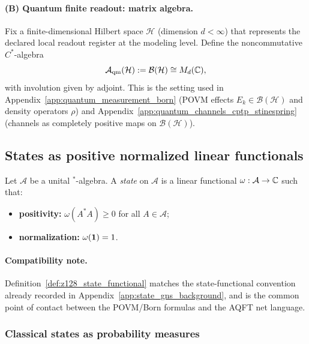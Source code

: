 \paragraph{(B) Quantum finite readout: matrix algebra.}
Fix a finite-dimensional Hilbert space $\mathcal{H}$ (dimension $d<\infty$) that represents the declared local readout register at the modeling level.
Define the noncommutative $C^\ast$-algebra
\[
\mathcal{A}_{\mathrm{qm}}(\mathcal{H}):=\mathcal{B}(\mathcal{H})\cong M_d(\mathbb{C}),
\]
with involution given by adjoint.
This is the setting used in Appendix~\ref{app:quantum_measurement_born} (POVM effects $E_k\in\mathcal{B}(\mathcal{H})$ and density operators $\rho$) and Appendix~\ref{app:quantum_channels_cptp_stinespring} (channels as completely positive maps on $\mathcal{B}(\mathcal{H})$).

\subsection{States as positive normalized linear functionals}

\begin{definition}\label{def:z128_state_functional}
\MathTag Let $\mathcal{A}$ be a unital $^\ast$-algebra.
A \emph{state} on $\mathcal{A}$ is a linear functional $\omega:\mathcal{A}\to\mathbb{C}$ such that:
\begin{itemize}
\item \textbf{positivity:} $\omega(A^\ast A)\ge 0$ for all $A\in\mathcal{A}$;
\item \textbf{normalization:} $\omega(\mathbf{1})=1$.
\end{itemize}
\end{definition}

\paragraph{Compatibility note.}
Definition~\ref{def:z128_state_functional} matches the state-functional convention already recorded in Appendix~\ref{app:state_gns_background}, and is the common point of contact between the POVM/Born formulas and the AQFT net language.

\subsubsection{Classical states as probability measures}

